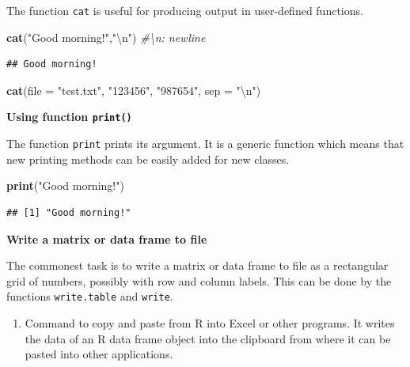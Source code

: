 \documentclass[]{book}
\newenvironment{Shaded}{\begin{snugshade}}{\end{snugshade}}
\newcommand{\KeywordTok}[1]{\textcolor[rgb]{0.13,0.29,0.53}{\textbf{#1}}}
\newcommand{\DataTypeTok}[1]{\textcolor[rgb]{0.13,0.29,0.53}{#1}}
\newcommand{\CharTok}[1]{\textcolor[rgb]{0.31,0.60,0.02}{#1}}
\newcommand{\StringTok}[1]{\textcolor[rgb]{0.31,0.60,0.02}{#1}}
\newcommand{\CommentTok}[1]{\textcolor[rgb]{0.56,0.35,0.01}{\textit{#1}}}
\newcommand{\NormalTok}[1]{#1}
\providecommand{\tightlist}{%
  \setlength{\itemsep}{0pt}\setlength{\parskip}{0pt}}
\begin{document}
The function \texttt{cat} is useful for producing output in user-defined
functions.

\begin{Shaded}
\begin{Highlighting}[]
\KeywordTok{cat}\NormalTok{(}\StringTok{"Good morning!"}\NormalTok{,}\StringTok{"}\CharTok{\textbackslash{}n}\StringTok{"}\NormalTok{) }\CommentTok{#\textbackslash{}n: newline}
\end{Highlighting}
\end{Shaded}

\begin{verbatim}
## Good morning!
\end{verbatim}

\begin{Shaded}
\begin{Highlighting}[]
\KeywordTok{cat}\NormalTok{(}\DataTypeTok{file =} \StringTok{"test.txt"}\NormalTok{, }\StringTok{"123456"}\NormalTok{, }\StringTok{"987654"}\NormalTok{, }\DataTypeTok{sep =} \StringTok{"}\CharTok{\textbackslash{}n}\StringTok{"}\NormalTok{)}
\end{Highlighting}
\end{Shaded}

\textbf{Using function \texttt{print()}}

The function \texttt{print} prints its argument. It is a generic
function which means that new printing methods can be easily added for
new classes.

\begin{Shaded}
\begin{Highlighting}[]
\KeywordTok{print}\NormalTok{(}\StringTok{"Good morning!"}\NormalTok{)}
\end{Highlighting}
\end{Shaded}

\begin{verbatim}
## [1] "Good morning!"
\end{verbatim}

\textbf{Write a matrix or data frame to file}

The commonest task is to write a matrix or data frame to file as a
rectangular grid of numbers, possibly with row and column labels. This
can be done by the functions \texttt{write.table} and \texttt{write}.

\begin{enumerate}
\def\labelenumi{\arabic{enumi}.}
\tightlist
\item
  Command to copy and paste from R into Excel or other programs. It
  writes the data of an R data frame object into the clipboard from
  where it can be pasted into other applications.
\end{enumerate}
\end{document}
